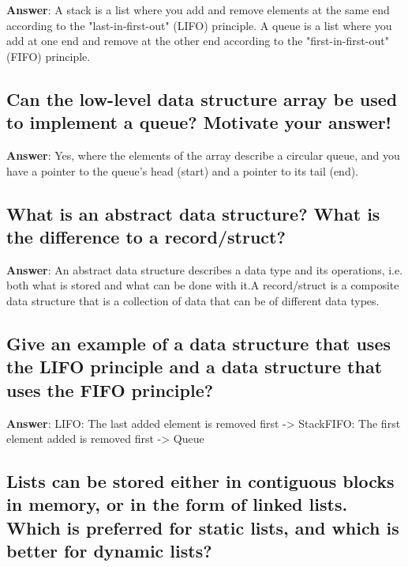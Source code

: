 \documentclass[a4paper,11pt,oneside]{article}
\begin{document}
\begin{sloppypar}
\label{q:258:sa:en:True}

\textbf{Answer}: A stack is a list where you add and remove elements at the same end according to the "last-in-first-out" (LIFO) principle. A queue is a list where you add at one end and remove at the other end according to the "first-in-first-out" (FIFO) principle.



\subsection{Can the low-level data structure array be used to implement a queue? Motivate your answer!}

\label{q:259:sa:en:True}

\textbf{Answer}: Yes, where the elements of the array describe a circular queue, and you have a pointer to the queue's head (start) and a pointer to its tail (end).



\subsection{What is an abstract data structure? What is the difference to a record/struct?}

\label{q:260:sa:en:True}

\textbf{Answer}: An abstract data structure describes a data type and its operations, i.e. both what is stored and what can be done with it.A record/struct is a composite data structure that is a collection of data that can be of different data types.



\subsection{Give an example of a data structure that uses the LIFO principle and a data structure that uses the FIFO principle?}

\label{q:261:sa:en:True}

\textbf{Answer}: LIFO: The last added element is removed first -> StackFIFO: The first element added is removed first -> Queue



\subsection{Lists can be stored either in contiguous blocks in memory, or in the form of linked lists. Which is preferred for static lists, and which is better for dynamic lists?}


\end{sloppypar}
\end{document}
